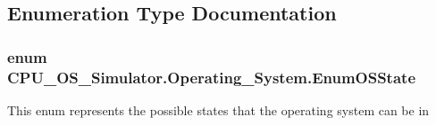 \subsection{Enumeration Type Documentation}
\hypertarget{namespace_c_p_u___o_s___simulator_1_1_operating___system_a03a98a403abc737c106a8f92db5bffc1}{}
\subsubsection[{Enum\+O\+S\+State}]{\setlength{\rightskip}{0pt plus 5cm}enum {\bf C\+P\+U\+\_\+\+O\+S\+\_\+\+Simulator.\+Operating\+\_\+\+System.\+Enum\+O\+S\+State}\hspace{0.3cm}{\ttfamily [strong]}}\label{namespace_c_p_u___o_s___simulator_1_1_operating___system_a03a98a403abc737c106a8f92db5bffc1}


This enum represents the possible states that the operating system can be in 

